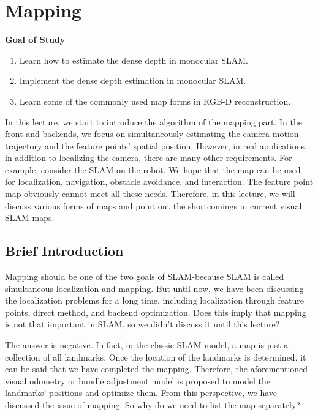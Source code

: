 \chapter{Mapping}
\label{cpt:12}
\begin{mdframed}  
	\textbf{Goal of Study}
	\begin{enumerate}[labelindent=0em,leftmargin=1.5em]
		\item Learn how to estimate the dense depth in monocular SLAM. 
		\item Implement the dense depth estimation in monocular SLAM.
		\item Learn some of the commonly used map forms in RGB-D reconstruction. 
	\end{enumerate}
\end{mdframed}

In this lecture, we start to introduce the algorithm of the mapping part. In the front and backends, we focus on simultaneously estimating the camera motion trajectory and the feature points' spatial position. However, in real applications, in addition to localizing the camera, there are many other requirements. For example, consider the SLAM on the robot. We hope that the map can be used for localization, navigation, obstacle avoidance, and interaction. The feature point map obviously cannot meet all these needs. Therefore, in this lecture, we will discuss various forms of maps and point out the shortcomings in current visual SLAM maps.

\newpage
\section{Brief Introduction}
Mapping should be one of the two goals of SLAM-because SLAM is called simultaneous localization and mapping. But until now, we have been discussing the localization problems for a long time, including localization through feature points, direct method, and backend optimization. Does this imply that mapping is not that important in SLAM, so we didn't discuss it until this lecture?

The answer is negative. In fact, in the classic SLAM model, a map is just a collection of all landmarks. Once the location of the landmarks is determined, it can be said that we have completed the mapping. Therefore, the aforementioned visual odometry or bundle adjustment model is proposed to model the landmarks' positions and optimize them. From this perspective, we have discussed the issue of mapping. So why do we need to list the map separately?

